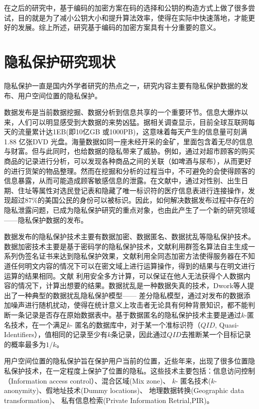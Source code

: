 在之后的研究中，基于编码的加密方案在码的选择和公钥的构造方式上做了很多尝试，目的就是为了减小公钥大小和提升算法效率，使得在实际中快速落地，才能更好的发展。综上所述，研究基于编码的加密方案具有十分重要的意义。


\section{隐私保护研究现状}
隐私保护一直是国内外学者研究的热点之一，研究内容主要有隐私保护数据的发布、用户空间位置的隐私保护。

数据发布是当前数据挖掘、数据分析到信息共享的一个重要环节。信息大爆炸以来，人们可以明显感受到大数据的来势凶猛。据相关调查显示，目前全球互联网每天的流量累计达1EB(即10亿GB 或1000PB)，这意味着每天产生的信息量可刻满1.88 亿张DVD 光盘。海量数据如同一座未经开采的金矿，里面包含着无尽的信息与财富。但与此同时，也给数据的隐私带来了威胁。例如，通过对超市顾客的购买商品的记录进行分析，可以发现各种商品之间的关联（如啤酒与尿布），从而更好的进行货架的物品整理。然而在挖掘和分析的过程当中，不可避免的会使得顾客的信息暴露，从而可能造成顾客敏感信息的泄露。在文献\cite{sweeney}中，通过对性别、出生日期、住址等属性对选民登记表和隐藏了唯一标识符的医疗信息表进行连接操作，发现超过87\%的美国公民的身份可以被标识。因此，如何解决数据发布过程中存在的隐私泄露问题，已成为隐私保护研究的重点对象，也由此产生了一个新的研究领域——隐私保护数据的发布。

数据发布的隐私保护技术主要有数据加密、数据匿名、数据扰乱等隐私保护技术。数据加密技术主要是基于密码学的隐私保护技术，文献\cite{group}利用群签名算法自主生成一系列伪签名证书来达到隐私保护效果，文献\cite{homomor}利用全同态加密方法使得服务器在不知道任何明文内容的情况下可以在密文域上进行运算操作，得到的结果与在明文进行运算的结果相同。文献\cite{muticompute} 利用安全多方计算，可以保证在他人无法获得个人数据内容的情况下，计算出想要的结果。数据扰乱是一种数据失真的技术，Dwork等人提出了一种典型的数据扰乱隐私保护模型—— 差分隐私模型\cite{differential}，通过对发布的数据添加噪声进行随机扰动，使得在统计意义上攻击者无论具有何种背景知识，都不能判断一条记录是否存在原始数据表中。基于数据匿名的隐私保护技术主要是通过{$k$}-匿名技术\cite{kanonomy}，在一个满足{$k$}- 匿名的数据库中，对于某一个准标识符（{$QID$}, Quasi-Identifiers），值相同的记录至少有{$k$}条记录，因此通过{$QID$}去推断某一个目标记录的概率最多为{$1/k$}。

用户空间位置的隐私保护旨在保护用户当前的位置，近些年来，出现了很多位置隐私保护技术，在一定程度上保护了位置的隐私。这些技术主要包括：信息访问控制（Information access control）\cite{Myles}\cite{Youssef}、混合区域(Mix zone)\cite{Beresford}、 {$k$}- 匿名技术({$k$}-anonymity)\cite{Bamba}\cite{Chow}\cite{Mokbel}、假地址技术(Dummy locations)\cite{YiuML}\cite{Shankar}、 地理数据转换(Geographic data transformation)\cite{HuH}\cite{Khoshgozaran}、 私有信息检索(Private Information Retrial,PIR)\cite{Ghinita}\cite{GhinitaPRIVE}。

